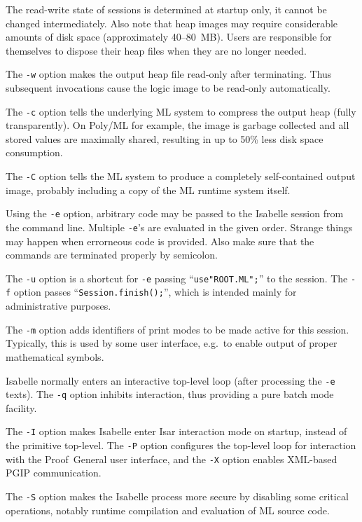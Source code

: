 The read-write state of sessions is determined at startup only, it cannot be
changed intermediately. Also note that heap images may require considerable
amounts of disk space (approximately 40--80~MB). Users are responsible for
themselves to dispose their heap files when they are no longer needed.

\medskip The \texttt{-w} option makes the output heap file read-only after
terminating.  Thus subsequent invocations cause the logic image to be
read-only automatically.

\medskip The \texttt{-c} option tells the underlying ML system to compress the
output heap (fully transparently).  On Poly/ML for example, the image is
garbage collected and all stored values are maximally shared, resulting in up
to 50\% less disk space consumption.

\medskip The \texttt{-C} option tells the ML system to produce a completely
self-contained output image, probably including a copy of the ML runtime
system itself.

\medskip Using the \texttt{-e} option, arbitrary {\ML} code may be passed to
the Isabelle session from the command line. Multiple \texttt{-e}'s are
evaluated in the given order. Strange things may happen when errorneous {\ML}
code is provided. Also make sure that the {\ML} commands are terminated
properly by semicolon.

\medskip The \texttt{-u} option is a shortcut for \texttt{-e} passing
``\texttt{use"ROOT.ML";}'' to the {\ML} session.  The \texttt{-f} option
passes ``\texttt{Session.finish();}'', which is intended mainly for
administrative purposes.

\medskip The \texttt{-m} option adds identifiers of print modes to be made
active for this session. Typically, this is used by some user interface, e.g.\ 
to enable output of proper mathematical symbols.

\medskip Isabelle normally enters an interactive top-level loop (after
processing the \texttt{-e} texts). The \texttt{-q} option inhibits
interaction, thus providing a pure batch mode facility.

\medskip The \texttt{-I} option makes Isabelle enter Isar interaction
mode on startup, instead of the primitive {\ML} top-level.  The
\texttt{-P} option configures the top-level loop for interaction with
the Proof~General user interface, and the \texttt{-X} option enables
XML-based PGIP communication.

\medskip The \texttt{-S} option makes the Isabelle process more secure
by disabling some critical operations, notably runtime compilation and
evaluation of ML source code.


